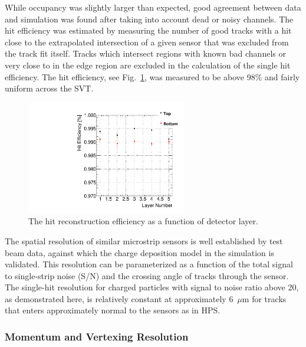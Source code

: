 \documentclass[final,3p,times,twocolumn]{elsarticle}
\begin{document}
While occupancy was slightly larger than expected, good agreement between data and simulation was 
found after taking into account dead or noisy channels. The hit efficiency was estimated by measuring 
the number of good tracks with a hit close to the extrapolated intersection of a given sensor that was 
excluded from the track fit itself. Tracks which intersect regions with known bad channels or very close to 
in the edge region are excluded in the calculation of the single hit efficiency. The hit efficiency, see 
Fig.~\ref{fig:hit_efficiency}, was measured to be above 98\% and fairly uniform across the SVT.
\begin{figure}[]
\begin{center}
{\small
    	\includegraphics[width=7cm]{figures/single_hit_efficiency_Omar_11192013.pdf}
        \caption{ The hit reconstruction efficiency as a function of detector layer.}
	\label{fig:hit_efficiency}
}
\end{center}
\end{figure}
The spatial resolution of similar microstrip sensors is well established by test beam data, against which 
the charge deposition model in the simulation is validated.  This resolution can be parameterized as a 
function of the total signal to single-strip noise (S/N) and the crossing angle of tracks through the sensor.  
The single-hit resolution for charged particles with signal to noise ratio above 20, as demonstrated 
here, is relatively constant at approximately 6~$\mu$m for tracks that enters approximately normal to the 
sensors as in HPS.



\subsubsection{Momentum and Vertexing Resolution}
\end{document}
